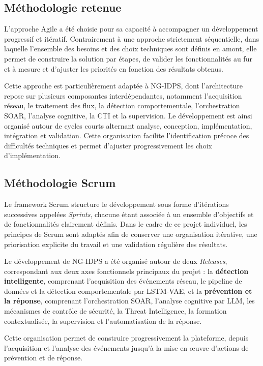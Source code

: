 \subsection{Méthodologie retenue}

L'approche Agile a été choisie pour sa capacité à accompagner un développement progressif et itératif. Contrairement à une approche strictement séquentielle, dans laquelle l'ensemble des besoins et des choix techniques sont définis en amont, elle permet de construire la solution par étapes, de valider les fonctionnalités au fur et à mesure et d'ajuster les priorités en fonction des résultats obtenus.

Cette approche est particulièrement adaptée à NG-IDPS, dont l'architecture repose sur plusieurs composantes interdépendantes, notamment l'acquisition réseau, le traitement des flux, la détection comportementale, l'orchestration SOAR, l'analyse cognitive, la CTI et la supervision. Le développement est ainsi organisé autour de cycles courts alternant analyse, conception, implémentation, intégration et validation. Cette organisation facilite l'identification précoce des difficultés techniques et permet d'ajuster progressivement les choix d'implémentation.

\subsection{Méthodologie Scrum}

Le framework Scrum structure le développement sous forme d'itérations successives appelées \textit{Sprints}, chacune étant associée à un ensemble d'objectifs et de fonctionnalités clairement définis. Dans le cadre de ce projet individuel, les principes de Scrum sont adaptés afin de conserver une organisation itérative, une priorisation explicite du travail et une validation régulière des résultats.

Le développement de NG-IDPS a été organisé autour de deux \textit{Releases}, correspondant aux deux axes fonctionnels principaux du projet : la \textbf{détection intelligente}, comprenant l'acquisition des événements réseau, le pipeline de données et la détection comportementale par LSTM-VAE, et la \textbf{prévention et la réponse}, comprenant l'orchestration SOAR, l'analyse cognitive par LLM, les mécanismes de contrôle de sécurité, la Threat Intelligence, la formation contextualisée, la supervision et l'automatisation de la réponse.

Cette organisation permet de construire progressivement la plateforme, depuis l'acquisition et l'analyse des événements jusqu'à la mise en œuvre d'actions de prévention et de réponse.

